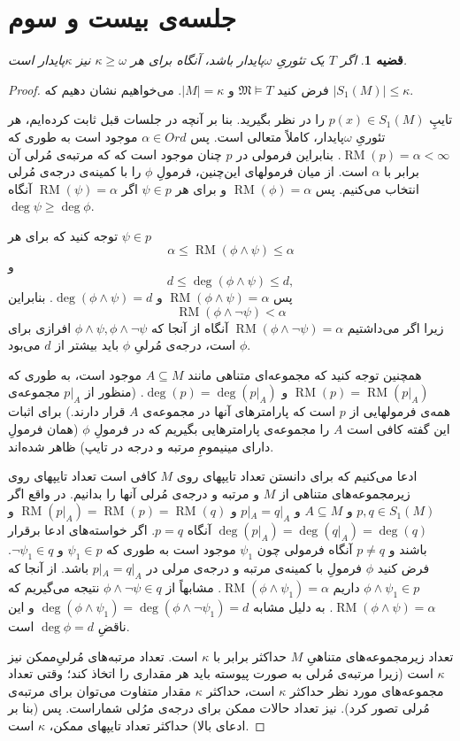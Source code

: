 \documentclass[12pt,a4paper]{report}
\theoremstyle{colorhead}
\newtheorem{thm}{قضیه}
\DeclareMathOperator{\RM}{RM}
\begin{document}
\section{جلسه‌ی بیست و سوم}
\begin{thm}
	اگر 
	$T$
	یک تئوریِ
	$\omega$پایدار باشد، آنگاه برای هر
$\kappa\geq \omega$
نیز
$\kappa$پایدار است.
	\end{thm}
\begin{proof}
	فرض کنید
	$\mathfrak{M}\models T$
	و
	$|M|=\kappa$.
	می‌خواهیم نشان دهیم که
	$|S_1(M)|\leq \kappa$.
	\par 
	تایپِ
	$p(x)\in S_1(M)$
	را در نظر بگیرید.
	بنا بر آنچه در جلسات قبل ثابت کرده‌ایم، هر تئوریِ
	$\omega$پایدار، کاملاً متعالی است.  پس
$\alpha\in Ord$
موجود است به طوری که
	$\RM(p)=\alpha<\infty$.
	بنابراین فرمولی 
در
$p$
چنان موجود است که 
که مرتبه‌ی مُرلی آن برابر با
$\alpha$
است. از میان فرمولهای این‌‌چنین، فرمولِ 
$\phi$
را با کمینه‌ی درجه‌ی مُرلی انتخاب می‌کنیم. پس
$\RM(\phi)=\alpha$
و برای هر
$\psi\in p$
اگر
$\RM (\psi)=\alpha$
آنگاه
$\deg \psi \geq \deg \phi$.
\par 
توجه کنید که برای هر
$\psi\in p$
\[
\alpha\leq \RM(\phi\wedge \psi)\leq \alpha
\]
و
\[
d\leq \deg (\phi\wedge \psi)\leq d,
\]
پس
$\RM(\phi\wedge\psi)=\alpha$
و
$\deg (\phi\wedge \psi)=d$.
بنابراین
\[
\RM(\phi\wedge\neg \psi)<\alpha
\]
زیرا اگر
می‌داشتیم
$\RM(\phi\wedge\neg \psi)=\alpha$
آنگاه از آنجا که 
$\phi\wedge \psi,\phi\wedge\neg \psi$
افرازی برای 
$\phi$
است، درجه‌ی مُرلیِ
$\phi$
باید بیشتر از
$d$
می‌بود. 
\par 
همچنین توجه کنید که مجموعه‌ای متناهی مانند
$A\subseteq M$
موجود است، به طوری که
$\RM(p)=\RM(p|_A)$
و
$\deg(p)=\deg (p|_A)$.
(منظور از
$p|_A$
مجموعه‌ی همه‌ی فرمولهایی از
$p$
است که پارامترهای آنها در مجموعه‌ی
$A$
قرار دارند.) برای اثبات این گفته کافی است 
$A$
را مجموعه‌ی پارامترهایی بگیریم که در فرمولِ
$\phi$
(همان فرمولِ دارای مینیمومِ مرتبه و درجه در تایپ) ظاهر شده‌اند. 
\par 
ادعا می‌کنیم که برای دانستن تعداد تایپهای روی 
$M$
کافی است تعداد تایپهای روی زیرمجموعه‌های متناهی از
$M$
و مرتبه‌ و درجه‌ی مُرلی آنها را بدانیم.  در واقع اگر
$p,q\in S_1(M)$
و 
$A\subseteq M$
و
$p|_A=q|_A$
و 
$\RM(p|_A)=\RM(p)=\RM(q)$
و
\mbox{$\deg(p|_A)=\deg(q|_A)=\deg(q)$}
آنگاه
$p=q$.
اگر خواسته‌های ادعا برقرار باشند و
$p\not=q$
آنگاه فرمولی چون
$\psi_1$
موجود است به طوری که
$\psi_1\in p$
و
$\neg \psi_1\in q$.
فرض کنید
$\phi$
فرمولِ با کمینه‌ی مرتبه و درجه‌ی مرلی در
$p|_A=q|_A$
باشد. 
از آنجا که 
$\phi\wedge\psi_1\in p$
داریم
$\RM(\phi\wedge \psi_1)=\alpha$.
مشابهاً 
از
$\phi\wedge\neg \psi\in q$
نتیجه می‌گیریم که
$\RM(\phi\wedge\psi)=\alpha$.
به دلیل مشابه
$\deg (\phi\wedge\psi_1)=\deg (\phi\wedge\neg\psi_1)=d$
و این ناقضِ
$\deg\phi=d$
است. 
\par 
تعداد زیرمجموعه‌های متناهیِ
$M$
حداکثر برابر با
$\kappa$
است. تعداد مرتبه‌های مُرلیِ‌ممکن نیز 
$\kappa$
است (زیرا مرتبه‌ی مُرلی به صورت پیوسته باید هر مقداری را اتخاذ کند؛ وقتی تعداد مجموعه‌های مورد نظر حداکثر
$\kappa$
است، حداکثر
$\kappa$
مقدار متفاوت می‌توان برای مرتبه‌ی مُرلی تصور کرد). نیز تعداد حالات ممکن برای درجه‌ی مرُلی شماراست. پس (بنا بر ادعای بالا) حداکثر تعداد تایپهای ممکن،
$\kappa$
است. 
	\end{proof}
\end{document}
